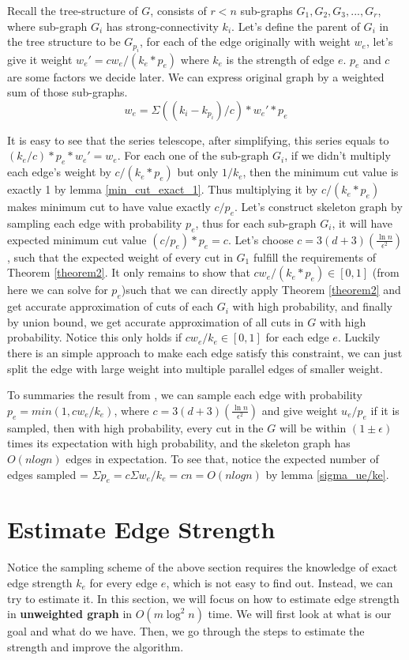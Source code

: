 \documentclass{article}
\begin{document}
Recall the tree-structure of $G$, consists of $r < n$ sub-graphs $G_1, G_2, G_3,..., G_r$, where sub-graph $G_i$ has strong-connectivity $k_i$. Let's define the parent of $G_i$ in the tree structure to be $G_{p_i}$, for each of the edge originally with weight $w_e$, let's give it weight $w_e' = cw_e/(k_e * p_e)$ where $k_e$ is the strength of edge $e$. $p_e$ and $c$ are some factors we decide later. We can express original graph by a weighted sum of those sub-graphs. 
\begin{equation}
    w_e = \Sigma ((k_i - k_{p_i}) / c) * w_e'* p_e
\end{equation}

It is easy to see that the series telescope, after simplifying, this series equals to $(k_e / c) * p_e * w_e' = w_e$. For each one of the sub-graph $G_i$, if we didn't multiply each edge's weight by $c/(k_e * p_e)$ but only $1/k_e$, then the minimum cut value is exactly 1 by lemma \ref{min_cut_exact_1}. Thus multiplying it by $c/(k_e * p_e)$ makes minimum cut to have value exactly $c/p_e$. Let's construct skeleton graph by sampling each edge with probability $p_e$, thus for each sub-graph $G_i$, it will have expected minimum cut value $(c/p_e) * p_e = c$. Let's choose $c = 3(d+3)(\frac{\ln{n}}{\epsilon^2})$, such that the expected weight of every cut in $G_1$ fulfill the requirements of Theorem \ref{theorem2}. It only remains to show that $cw_e/(k_e * p_e) \in [0, 1]$ (from here we can solve for $p_e$)such that we can directly apply Theorem \ref{theorem2} and get accurate approximation of cuts of each $G_i$ with high probability, and finally by union bound, we get accurate approximation of all cuts in $G$ with high probability. Notice this only holds if $cw_e/k_e \in [0, 1]$ for each edge $e$. Luckily there is an simple approach to make each edge satisfy this constraint, we can just split the edge with large weight into multiple parallel edges of smaller weight. 
\bigskip

To summaries the result from \cite{benczur2015randomized}, we can sample each edge with probability $p_e = min(1, cw_e/k_e)$,
where $c = 3(d+3)(\frac{\ln{n}}{\epsilon^2})$ and give weight $u_e/p_e$ if it is sampled, then with high probability, every cut in the $G$ will be within $(1 \pm \epsilon)$ times its expectation with high probability, and the skeleton graph has $O(nlogn)$ edges in expectation. To see that, notice the expected number of edges sampled = $\Sigma p_e = c\Sigma w_e/k_e = cn = O(nlogn)$ by lemma \ref{sigma_ue/ke}. 

\section{Estimate Edge Strength}
Notice the sampling scheme of the above section requires the knowledge of exact edge strength $k_e$ for every edge $e$, which is not easy to find out. Instead, we can try to estimate it. In this section, we will focus on how to estimate edge strength in \textbf{unweighted graph} in $O(m\log^2n)$ time. We will first look at what is our goal and what do we have. Then, we go through the steps to estimate the strength and improve the algorithm.
\end{document}
